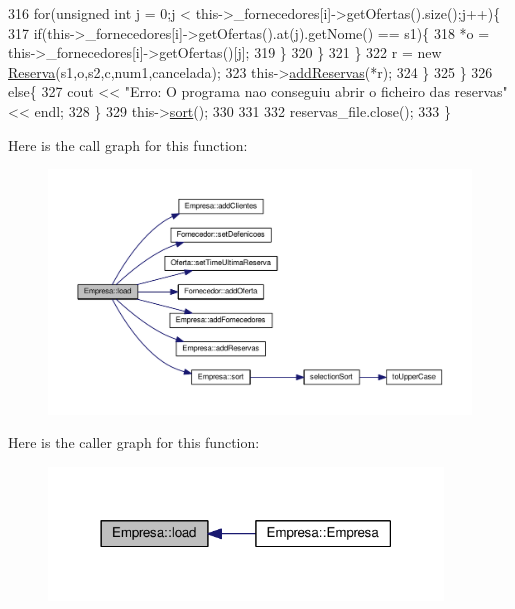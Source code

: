 \begin{DoxyCode}
316                             \textcolor{keywordflow}{for}(\textcolor{keywordtype}{unsigned} \textcolor{keywordtype}{int} j = 0;j < this->\_fornecedores[i]->getOfertas().size();j++)\{
317                                 \textcolor{keywordflow}{if}(this->\_fornecedores[i]->getOfertas().at(j).getNome() == s1)\{
318                                     *o = this->\_fornecedores[i]->getOfertas()[j];
319                                 \}
320                             \}
321                         \}
322             r = \textcolor{keyword}{new} \hyperlink{classReserva}{Reserva}(s1,o,s2,c,num1,cancelada);
323             this->\hyperlink{classEmpresa_a42a1671b234ab8380cfb2ed33517edb2}{addReservas}(*r);
324         \}
325     \}
326     \textcolor{keywordflow}{else}\{
327         cout << \textcolor{stringliteral}{"Erro: O programa nao conseguiu abrir o ficheiro das reservas"} << endl;
328     \}
329     this->\hyperlink{classEmpresa_aa7424cde3bdf1b1921967bc176d0ab50}{sort}();
330 
331 
332     reservas\_file.close();
333 \}
\end{DoxyCode}


Here is the call graph for this function\+:
\nopagebreak
\begin{figure}[H]
\begin{center}
\leavevmode
\includegraphics[width=350pt]{classEmpresa_a3445c3c507b4f45d1d7831908ff4cdf1_cgraph}
\end{center}
\end{figure}




Here is the caller graph for this function\+:\nopagebreak
\begin{figure}[H]
\begin{center}
\leavevmode
\includegraphics[width=297pt]{classEmpresa_a3445c3c507b4f45d1d7831908ff4cdf1_icgraph}
\end{center}
\end{figure}


